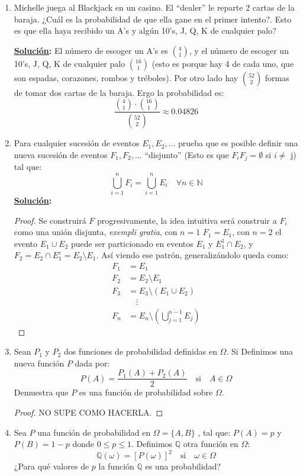 \documentclass[11pt,letterpaper]{report}
\newcommand{\N}{\mathbb{N}}
\newcommand{\sol}{\textbf{\underline{Solución}: }} %
\begin{document}
\begin{enumerate}
\item Michelle juega al Blackjack en un casino. El ``dealer'' le reparte 2 cartas de la baraja.
¿Cuál es la probabilidad de que ella gane en el primer intento?. Esto es que ella haya
recibido un A's y algún 10's, J, Q, K de cualquier palo?

\sol El número de escoger un A's es $\binom{4}{1}$, y el número de escoger un 10's, J, Q, K de
cualquier palo $\binom{16}{1}$ (esto es porque hay 4 de cada uno, que son espadas, corazones, rombos
y tréboles). Por otro lado hay $\binom{52}{2}$ formas de tomar dos cartas de la baraja. Ergo la
probabilidad es:
\[
    \frac{\binom{4}{1} \cdot \binom{16}{1}}{\binom{52}{2}} \approx 0.04826
\]

\item Para cualquier sucesión de eventos $E_1, E_2, \ldots$ prueba que es posible definir una
nueva sucesión de eventos $F_1, F_2, \ldots$ ``disjunto'' (Esto es que $F_iF_j =\emptyset$
si $i \not=$ j) tal que:
\[
    \bigcup_{i=1}^{n} F_i = \bigcup_{i=1}^{n} E_i \quad \forall n \in \N
\]
\sol \begin{proof}
    Se construirá $F$ progresivamente, la idea intuitiva será construir a $F_i$
    como una unión disjunta, \textit{exempli gratia}, con $n=1$ $F_1 = E_1$,
    con $n=2$ el evento $E_1 \cup E_2$ puede ser particionado en eventos $E_1$ y $E_1^1 \cap E_2$,
    y $F_2 = E_2 \cap E_1^c = E_2 \setminus E_1$. Así viendo ese patrón, generalizándolo queda como:
    \begin{align*}
        F_1 &= E_1\\
        F_2 &= E_2 \setminus E_1\\
        F_3 &= E_3 \setminus (E_1 \cup E_2)\\
        &\quad\vdots\\
        F_n &= E_n \setminus (\bigcup_{j=1}^{n-1} E_j)
    \end{align*}
\end{proof}

\item Sean $P_1$ y $P_2$ dos funciones de probabilidad definidas en $\Omega$. Si Definimos una
nueva función $P$ dada por:
\[
    P(A) = \frac{P_1(A)+P_2(A)}{2} \quad \text{si} \quad A \in \Omega
\]
Demuestra que $P$ es una función de probabilidad sobre $\Omega$.
\begin{proof}
    NO SUPE COMO HACERLA.
\end{proof}

\item Sea $P$ una función de probabilidad en $\Omega= \{ A,B \}$ , tal que: $P(A)=p$ y
$P(B)=1-p$ donde $0 \leq p \leq1$.
Definimos $\mathds{Q}$ otra función en $\Omega$:
\[
    \mathds{Q}(\omega) = [P(\omega)]^2 \quad \text{si} \quad \omega \in \Omega
\]
¿Para qué valores de $p$ la función $\mathds{Q}$ es una probabilidad?


\end{enumerate}
\end{document}
